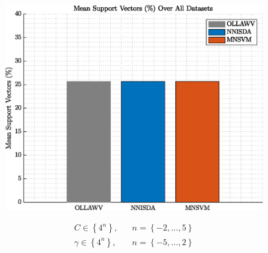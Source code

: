 \documentclass{article}
\newcommand{\set}[1]{{\left\{#1\right\}}}
\begin{document}
\begin{figure}[t!]
\begin{minipage}{0.3\textwidth}
\includegraphics[width=\textwidth]{../../figures/mean_sv.eps}
\end{minipage}
\label{fig:cpuvssamples}
\end{figure}

\begin{subequations}
\label{eq:hyperparamolla}
\begin{align}
C \in \set{4^n}, & \,\,\,\,\,n = \set{-2, \ldots, 5} \label{eq:paramColla}\\
\gamma \in \set{4^n},  & \,\,\,\,\,n = \set{-5, \ldots, 2} \label{eq:paramGolla}
\end{align}
\end{subequations}
\end{document}

